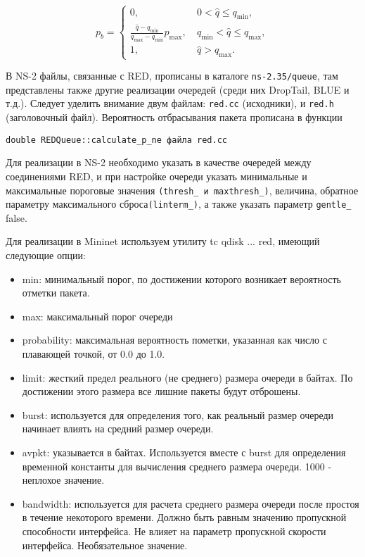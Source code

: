 \begin{equation}
\label{eq2:1}
p_{b} = \begin{cases}
        0, &  \ 0 < \hat{q} \leqslant q_{\min},
        \\
        \frac{\hat{q} - q_{\min}}{q_{\max} - q_{\min}} p_{\max}, & \ q_{\min} < \hat{q} \leqslant q_{\max}, 
        \\
        1, &  \ \hat{q} > q_{\max}.
\end{cases}                                     
\end{equation}


В NS-2 файлы, связанные с RED, прописаны в каталоге
\verb|ns-2.35/queue|, там представлены также другие реализации
очередей (среди них DropTail, BLUE и т.д.). Следует уделить внимание
двум файлам: \verb|red.cc| (исходники), и \verb|red.h| (заголовочный
файл). Вероятность отбрасывания пакета прописана в функции

\verb|double REDQueue::calculate_p_ne файла red.cc|

Для реализации в NS-2 необходимо указать в качестве очередей между соединениями
RED, и при настройке очереди указать минимальные и максимальные пороговые значения 
\verb|(thresh_ и maxthresh_)|, величина, обратное параметру максимального сброса\verb|(linterm_)|, 
а также указать параметр \verb|gentle_| false.

Для реализации в Mininet используем утилиту tc qdisk ... red, имеющий следующие опции:
\begin{itemize}
\item min: минимальный порог, по достижении которого возникает вероятность отметки пакета.
\item max: максимальный порог очереди
\item probability: максимальная вероятность пометки, указанная как число с плавающей точкой, от 0.0 до 1.0. 
\item limit: жесткий предел реального (не среднего) размера очереди в байтах. По достижении этого размера все лишние пакеты будут отброшены.
\item burst: используется для определения того, как реальный размер очереди начинает влиять на средний размер очереди. 
\item avpkt: указывается в байтах. Используется вместе с burst для определения временной константы для вычисления среднего размера очереди. 1000 - неплохое значение.
\item bandwidth: используется для расчета среднего размера очереди после простоя в течение некоторого времени. Должно быть равным значению пропускной способности интерфейса. Не влияет на параметр пропускной скорости интерфейса. Необязательное значение.

\end{itemize}

